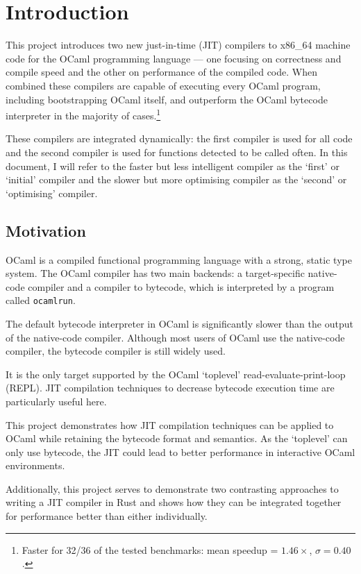 \chapter{Introduction}

This project introduces two new just-in-time (JIT) compilers to x86\_64 machine code for the OCaml
programming language --- one focusing on correctness and compile speed and the other on performance
of the compiled code. When combined these compilers are capable of executing every OCaml program,
including bootstrapping OCaml itself, and outperform the OCaml bytecode interpreter in the majority
of cases.\footnote{
      Faster for 32/36 of the tested benchmarks: mean speedup = $1.46\times$, $\sigma =
            0.40$.}

These compilers are integrated dynamically: the first compiler is
used for all code and the second compiler is used for functions detected to be called often.  In
this document, I will refer to the faster but less intelligent compiler as the `first' or `initial'
compiler and the slower but more optimising compiler as the `second' or `optimising' compiler.

\section{Motivation}

OCaml is a compiled functional programming language with a strong, static type system. The OCaml
compiler has two main backends: a target-specific native-code compiler and a compiler to
bytecode, which is interpreted by a program called \texttt{ocamlrun}.

The default bytecode interpreter in OCaml is significantly slower than the output of the
native-code compiler. Although most users of OCaml use the native-code compiler, the bytecode
compiler is still widely used.

It is the only target supported by the OCaml `toplevel' read-evaluate-print-loop
(REPL).
JIT compilation techniques to decrease bytecode execution time are particularly useful here.

This project demonstrates how JIT compilation techniques can be applied to OCaml while retaining
the bytecode format and semantics. As the `toplevel' can only use
bytecode, the JIT could lead to better performance in interactive OCaml environments.

Additionally, this project serves to demonstrate two contrasting approaches to writing a JIT
compiler in Rust and shows how they can be integrated together for performance better than
either individually.

